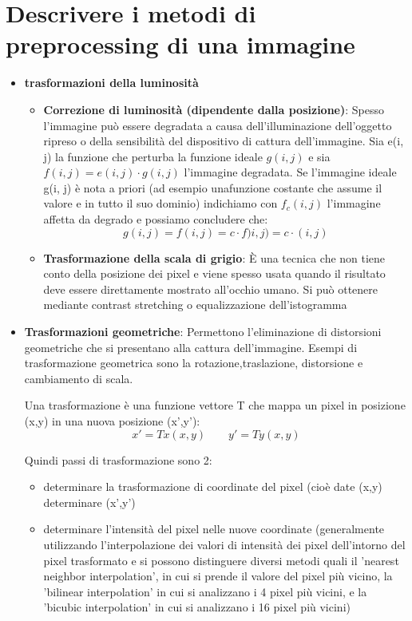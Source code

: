 \section{Descrivere i metodi di preprocessing di una immagine}
\begin{itemize}
	\item \textbf{trasformazioni della luminosità}
	\begin{itemize}
		\item \textbf{Correzione di luminosità (dipendente dalla posizione)}: Spesso l'immagine può essere degradata a causa dell'illuminazione dell'oggetto ripreso o della sensibilità del dispositivo di cattura dell'immagine.
		Sia e(i, j) la funzione che perturba la funzione ideale $g(i, j)$ e sia $f (i, j) = e(i, j) \cdotp g(i, j)$ l'immagine degradata. Se l'immagine ideale g(i, j) è nota a priori (ad esempio unafunzione costante che assume il valore e in tutto il suo dominio) indichiamo con $f_c (i, j)$ l'immagine affetta da degrado e possiamo concludere che:
		$$
		g(i,j) = f(i,j)= c \cdotp f)i,j)= c \cdotp (i,j)
		$$
		
		\item \textbf{Trasformazione della scala di grigio}: È una tecnica che non tiene conto della posizione dei pixel e viene spesso usata quando il risultato deve essere direttamente mostrato all'occhio umano. Si può ottenere mediante contrast stretching o equalizzazione dell'istogramma
	\end{itemize}
	
	\item \textbf{Trasformazioni geometriche}: Permettono l'eliminazione di distorsioni geometriche che si 	presentano alla cattura dell'immagine. Esempi di trasformazione geometrica sono la	rotazione,traslazione, distorsione e cambiamento di scala.
	
	Una trasformazione è una funzione vettore T che mappa un pixel in posizione (x,y) in una nuova posizione (x',y'):
	$$
	x' = Tx(x,y) \qquad y'= Ty(x,y)
	$$
	
	Quindi  passi di trasformazione sono 2:
	\begin{itemize}
		\item determinare la trasformazione di coordinate del pixel (cioè date (x,y) determinare (x',y')
		
		\item determinare l'intensità del pixel nelle nuove coordinate (generalmente utilizzando l'interpolazione dei valori di intensità dei pixel dell'intorno del pixel trasformato e si possono distinguere diversi metodi quali il 'nearest neighbor interpolation', in cui si prende	il valore del pixel più vicino, la 'bilinear interpolation' in cui si analizzano i 4 pixel più vicini, e la 'bicubic interpolation' in cui si analizzano i 16 pixel più vicini)
	\end{itemize}
	

\end{itemize}
